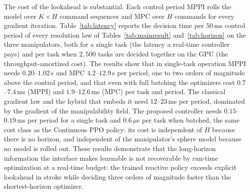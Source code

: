 \documentclass[journal, twoside]{IEEEtran}
\begin{document}
The cost of the lookahead is substantial. Each control period MPPI
rolls the model over $K\times H$ command sequences and MPC over $H$
commands for every gradient iteration. Table~\ref{tab:latency} reports
the decision time per $50$\,ms control period of every resolution law
of Tables~\ref{tab:mainresult} and~\ref{tab:horizon} on the three
manipulators, both for a single task (the latency a real-time controller
pays) and per task when $2{,}500$ tasks are decided together on the GPU
(the throughput-amortized cost). The results show that in single-task
operation MPPI needs $0.20$--$1.02$\,s and MPC $4.2$--$12.9$\,s per
period, one to two orders of magnitude above the control period, and
that even with full batching the optimizers cost $0.7$--$7.4$\,ms (MPPI)
and $1.9$--$12.6$\,ms (MPC) per task and period. The classical gradient
law and the hybrid that embeds it need $12$--$23$\,ms per period,
dominated by the gradient of the manipulability field. The proposed
controller needs $0.15$--$0.19$\,ms per period for a single task and
$0.6$\,$\mu$s per task when batched, the same cost class as the
Continuous PPO policy: its cost is independent of $H$ because there is
no horizon, and independent of the manipulator's sphere model because
no model is rolled out. These results demonstrate that the long-horizon
information the interface makes learnable is not recoverable by run-time
optimization at a real-time budget: the trained reactive policy exceeds
explicit lookahead in stroke while deciding three orders of magnitude
faster than the shortest-horizon optimizer.
\end{document}
